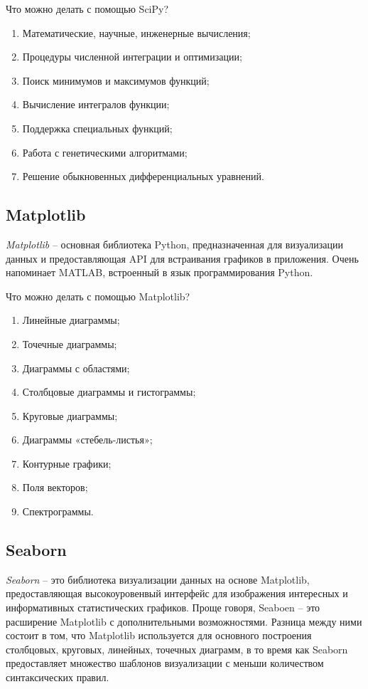 Что можно делать с помощью SciPy?

\begin{enumerate}
	\item Математические, научные, инженерные вычисления;	
	\item Процедуры численной интеграции и оптимизации;
	\item Поиск минимумов и максимумов функций;
	\item Вычисление интегралов функции;
	\item Поддержка специальных функций;
	\item Работа с генетическими алгоритмами;
	\item Решение обыкновенных дифференциальных уравнений.
\end{enumerate}

\subsection{Matplotlib}

\textit{Matplotlib} -- основная библиотека Python, предназначенная для визуализации данных и предоставляющая API для встраивания графиков в приложения. Очень напоминает MATLAB, встроенный в язык программирования Python.

Что можно делать с помощью Matplotlib?

\begin{enumerate}
	\item Линейные диаграммы;
	\item Точечные диаграммы;
	\item Диаграммы с областями;
	\item Столбцовые диаграммы и гистограммы;
	\item Круговые диаграммы;
	\item Диаграммы «стебель-листья»;
	\item Контурные графики;
	\item Поля векторов;
	\item Спектрограммы.
\end{enumerate}

\subsection{Seaborn}

\textit{Seaborn} -- это библиотека визуализации данных на основе Matplotlib, предоставляющая высокоуровенвый интерфейс для изображения интересных и информативных статистических графиков. Проще говоря, Seaboen -- это расширение Matplotlib с дополнительными возможностями. Разница между ними состоит в том, что Matplotlib используется для основного построения столбцовых, круговых, линейных, точечных диаграмм, в то время как Seaborn предоставляет множество шаблонов визуализации с меньши количеством синтаксических правил.

